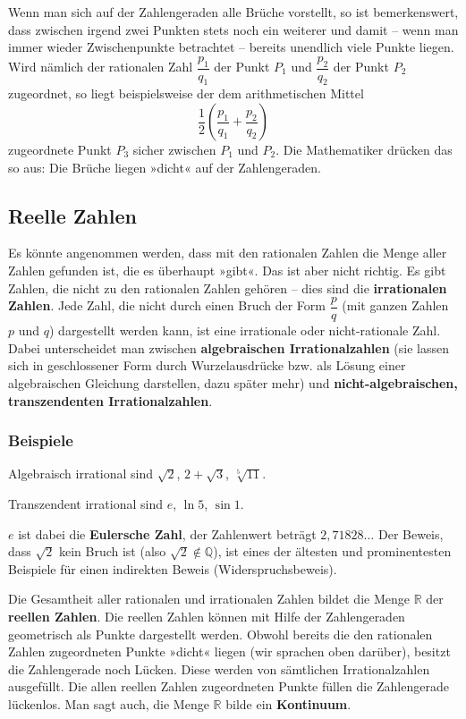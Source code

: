 Wenn man sich auf der Zahlengeraden alle Brüche vorstellt, so ist bemerkenswert, dass zwischen irgend zwei Punkten stets noch ein weiterer und damit -- wenn man immer wieder Zwischenpunkte betrachtet -- bereits unendlich viele Punkte liegen. Wird nämlich der rationalen Zahl $\dfrac{p_1}{q_1}$ der Punkt $P_1$ und $\dfrac{p_2}{q_2}$ der Punkt $P_2$ zugeordnet, so liegt beispielsweise der dem arithmetischen Mittel
\[ \frac{1}{2}\left(\frac{p_1}{q_1} + \frac{p_2}{q_2}\right) \]
zugeordnete Punkt $P_3$ sicher zwischen $P_1$ und $P_2$. Die Mathematiker drücken das so aus: Die Brüche liegen »dicht« auf der Zahlengeraden.

\subsection{Reelle Zahlen}

Es könnte angenommen werden, dass mit den rationalen Zahlen die Menge aller Zahlen gefunden ist, die es überhaupt »gibt«. Das ist aber nicht richtig. Es gibt Zahlen, die nicht zu den rationalen Zahlen gehören -- dies sind die \textbf{irrationalen Zahlen}. Jede Zahl, die nicht durch einen Bruch der Form $\dfrac{p}{q}$ (mit ganzen Zahlen $p$ und $q$) dargestellt werden kann, ist eine irrationale oder nicht-rationale Zahl. Dabei unterscheidet man zwischen \textbf{algebraischen Irrationalzahlen} (sie lassen sich in geschlossener Form durch Wurzelausdrücke bzw. als Lösung einer algebraischen Gleichung darstellen, dazu später mehr) und \textbf{nicht-algebraischen, transzendenten Irrationalzahlen}.

\subsubsection{Beispiele}

Algebraisch irrational sind $\sqrt{2}$, $2+\sqrt{3}$, $\sqrt[5]{11}$.

Transzendent irrational sind $e$, $\ln 5$, $\sin 1$.\beispielende

$e$ ist dabei die \textbf{Eulersche Zahl}, der Zahlenwert beträgt $2{,}71828\ldots$ Der Beweis, dass $\sqrt{2}$ kein Bruch ist (also $\sqrt{2} \notin \mathbb{Q}$), ist eines der ältesten und prominentesten Beispiele für einen indirekten Beweis (Widerspruchsbeweis).

Die Gesamtheit aller rationalen und irrationalen Zahlen bildet die Menge $\mathbb{R}$ der \textbf{reellen Zahlen}. Die reellen Zahlen können mit Hilfe der Zahlengeraden geometrisch als Punkte dargestellt werden. Obwohl bereits die den rationalen Zahlen zugeordneten Punkte »dicht« liegen (wir sprachen oben darüber), besitzt die Zahlengerade noch Lücken. Diese werden von sämtlichen Irrationalzahlen ausgefüllt. Die allen reellen Zahlen zugeordneten Punkte füllen die Zahlengerade lückenlos. Man sagt auch, die Menge $\mathbb{R}$ bilde ein \textbf{Kontinuum}.

